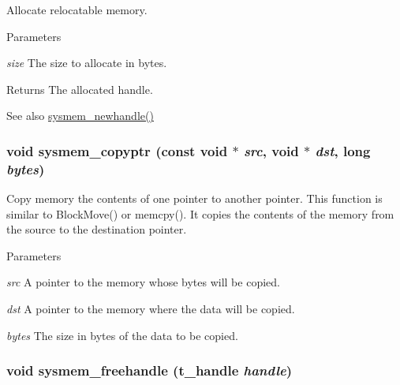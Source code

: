 Allocate relocatable memory. 
\begin{DoxyParams}{Parameters}
\item[{\em size}]The size to allocate in bytes. \end{DoxyParams}
\begin{DoxyReturn}{Returns}
The allocated handle. 
\end{DoxyReturn}
\begin{DoxySeeAlso}{See also}
\hyperlink{group__memory_gacdacfad4785c71dc8c4ce5d4d9714d54}{sysmem\_\-newhandle()} 
\end{DoxySeeAlso}
\hypertarget{group__memory_ga527cceb7178a110b73ca01fdc41702b4}{
\subsubsection[{sysmem\_\-copyptr}]{\setlength{\rightskip}{0pt plus 5cm}void sysmem\_\-copyptr (const void $\ast$ {\em src}, \/  void $\ast$ {\em dst}, \/  long {\em bytes})}}
\label{group__memory_ga527cceb7178a110b73ca01fdc41702b4}


Copy memory the contents of one pointer to another pointer. This function is similar to BlockMove() or memcpy(). It copies the contents of the memory from the source to the destination pointer.


\begin{DoxyParams}{Parameters}
\item[{\em src}]A pointer to the memory whose bytes will be copied. \item[{\em dst}]A pointer to the memory where the data will be copied. \item[{\em bytes}]The size in bytes of the data to be copied. \end{DoxyParams}
\hypertarget{group__memory_ga5815994f7d02b77c24f8c684df9acd83}{
\subsubsection[{sysmem\_\-freehandle}]{\setlength{\rightskip}{0pt plus 5cm}void sysmem\_\-freehandle ({\bf t\_\-handle} {\em handle})}}
\label{group__memory_ga5815994f7d02b77c24f8c684df9acd83}


